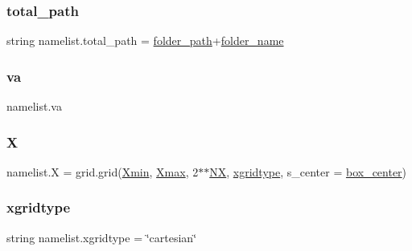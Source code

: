 \subsubsection{\texorpdfstring{total\+\_\+path}{total\_path}}
{\footnotesize\ttfamily string namelist.\+total\+\_\+path = \hyperlink{namespacenamelist_a3b503c014a95b4fe0b14a45005ff8270}{folder\+\_\+path}+\hyperlink{namespacenamelist_ae4a2b399bbe52993d2d43c55ac29e961}{folder\+\_\+name}}

\mbox{\label{namespacenamelist_a846209f02cb16bb8cd9701290aeb9829}} 
\subsubsection{\texorpdfstring{va}{va}}
{\footnotesize\ttfamily namelist.\+va}

\mbox{\label{namespacenamelist_af0c918988527847f8c4d92e5dd09cde0}} 
\subsubsection{\texorpdfstring{X}{X}}
{\footnotesize\ttfamily namelist.\+X = grid.\+grid(\hyperlink{namespacenamelist_a512ba0df866fdbf44bfdd6dab3846aba}{Xmin}, \hyperlink{namespacenamelist_a9b5f75b28f87c2258e7f52b41cabcd8f}{Xmax}, 2$\ast$$\ast$\hyperlink{namespacenamelist_ac228fb8e42706311969779d134433edd}{NX}, \hyperlink{namespacenamelist_aa070f33430efb3ee85a15f4c91b8165f}{xgridtype}, s\+\_\+center = \hyperlink{namespacenamelist_a364797b64f69de89c19410bc987ce594}{box\+\_\+center})}

\mbox{\label{namespacenamelist_aa070f33430efb3ee85a15f4c91b8165f}} 
\subsubsection{\texorpdfstring{xgridtype}{xgridtype}}
{\footnotesize\ttfamily string namelist.\+xgridtype = \char`\"{}cartesian\char`\"{}}

\mbox{\label{namespacenamelist_a3cf16c58d15de0a13f6ef0e3e40980a1}} 
